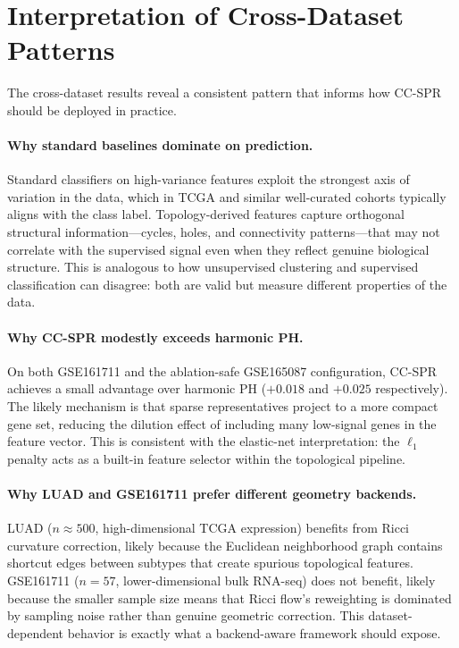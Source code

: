 \documentclass[11pt]{article}
\begin{document}
\section{Interpretation of Cross-Dataset Patterns}

The cross-dataset results reveal a consistent pattern that informs how CC-SPR should be deployed in practice.

\paragraph{Why standard baselines dominate on prediction.}
Standard classifiers on high-variance features exploit the strongest axis of variation in the data, which in TCGA and similar well-curated cohorts typically aligns with the class label.
Topology-derived features capture orthogonal structural information---cycles, holes, and connectivity patterns---that may not correlate with the supervised signal even when they reflect genuine biological structure.
This is analogous to how unsupervised clustering and supervised classification can disagree: both are valid but measure different properties of the data.

\paragraph{Why CC-SPR modestly exceeds harmonic PH.}
On both GSE161711 and the ablation-safe GSE165087 configuration, CC-SPR achieves a small advantage over harmonic PH ($+0.018$ and $+0.025$ respectively).
The likely mechanism is that sparse representatives project to a more compact gene set, reducing the dilution effect of including many low-signal genes in the feature vector.
This is consistent with the elastic-net interpretation: the $\ell_1$ penalty acts as a built-in feature selector within the topological pipeline.

\paragraph{Why LUAD and GSE161711 prefer different geometry backends.}
LUAD ($n \approx 500$, high-dimensional TCGA expression) benefits from Ricci curvature correction, likely because the Euclidean neighborhood graph contains shortcut edges between subtypes that create spurious topological features.
GSE161711 ($n = 57$, lower-dimensional bulk RNA-seq) does not benefit, likely because the smaller sample size means that Ricci flow's reweighting is dominated by sampling noise rather than genuine geometric correction.
This dataset-dependent behavior is exactly what a backend-aware framework should expose.
\end{document}
